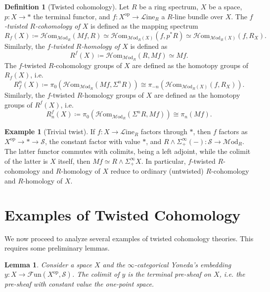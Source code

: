 \documentclass[a4paper]{book}
\newcommand{\lF}{\mathcal{F}}
\newcommand{\lH}{\mathcal{H}}
\newcommand{\lL}{\mathcal{L}}
\newcommand{\lM}{\mathcal{M}}
\newcommand{\lS}{\mathcal{S}}
\newcommand{\op}{\mathrm{op}}
\newcommand{\Fun}{\lF\mathrm{un}} %
\newcommand{\Hom}{\lH\mathrm{om}} %
\renewcommand{\Line}{\lL\mathrm{ine}} %
\newcommand{\Mod}{\lM\mathrm{od}} %
\newtheorem{lemma}[equation]{Lemma}
\theoremstyle{definition}
\newtheorem{definition}[equation]{Definition}
\newtheorem{example}[equation]{Example}
\theoremstyle{remark}
\numberwithin{equation}{section}
\begin{document}


\begin{definition}[{Twisted cohomology}] \label{def:twistedcohomology}
	Let $R$ be a ring spectrum, $X$ be a space, $p\colon X \to *$ the terminal functor, and $f\colon X^{\op} \to \Line_R$ a $R$-line bundle over $X$.  The \emph{$f$-twisted $R$-cohomology of $X$} is defined as the mapping spectrum 
	\[ R_f(X)	\coloneqq \Hom_{\Mod_R}(Mf, R) \simeq \Hom_{\Mod_R(X)}(f,p^*R) \simeq \Hom_{\Mod_R(X)}(f,R_X) .\]
	Similarly, the \emph{$f$-twisted $R$-homology of $X$} is defined as
	\[ R^f(X) \coloneqq \Hom_{\Mod_R}(R,Mf) \simeq Mf. \]
	The $f$-twisted $R$-cohomology groups of $X$ are defined as the homotopy groups of $R_f(X)$, i.e.
	\[ R^n_f(X) \coloneqq \pi_0(\Hom_{\Mod_R}(Mf, \Sigma^n R)) \cong \pi_{-n}(\Hom_{\Mod_R(X)}(f,R_X)). \]Similarly, the $f$-twisted $R$-homology groups of $X$ are defined as the homotopy groups of $R^f(X)$, i.e. 
	\[ R_n^f(X) \coloneqq \pi_0(\Hom_{\Mod_R}(\Sigma^n R, Mf)) \cong \pi_n(Mf). \]
\end{definition}

\begin{example}[Trivial twist] If $f:X\to \Line_R$ factors through $*$, then $f$ factors as $X^{\op}\to*\to\lS$, the constant factor with value $*$, and $R\wedge\Sigma^\infty_+(-):\lS\to\Mod_R$. The latter functor commutes with colimits, being a left adjoint, while the colimit of the latter is $X$ itself, then $Mf\simeq R\wedge\Sigma^\infty_+X$. In particular, $f$-twisted $R$-cohomology and $R$-homology of $X$ reduce to ordinary (untwisted) $R$-cohomology and $R$-homology of $X$. 
\end{example}


\section{Examples of Twisted Cohomology}
We now proceed to analyze several examples of twisted cohomology	theories. This requires some preliminary lemmas.

\begin{lemma}
	Consider a space $X$ and the $\infty$-categorical Yoneda's embedding $y:X\to\Fun(X^{\op},\lS)$. The colimit of $y$ is the terminal pre-sheaf on $X$, i.e. the pre-sheaf with constant value the one-point space. 
\end{lemma}
\end{document}
